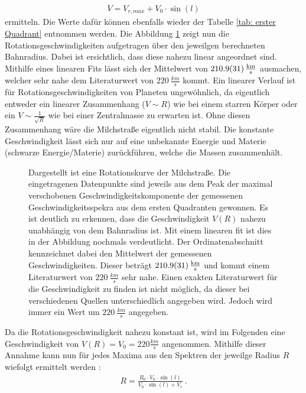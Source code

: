 \begin{align}
    V = V_{r,max} + V_0 \cdot \sin(l)
    \label{eq:V(R)}
\end{align}
ermitteln. Die Werte dafür können ebenfalls wieder der Tabelle \ref{tab: erster Quadrant} entnommen werden. Die Abbildung \ref{fig:VvonR} zeigt nun die Rotationsgeschwindigkeiten aufgetragen über den jeweilgen berechneten Bahnradius. Dabei ist ersichtlich, dass diese nahezu linear angeordnet sind. Mithilfe eines linearen Fits lässt sich der Mittelwert von $\SI{210.9 \pm 3.1}{\frac{km}{s}}$ ausmachen, welcher sehr nahe dem Literaturwert von $\SI{220}{\frac{km}{s}}$ \cite{LSR} kommt. Ein linearer Verlauf ist für Rotationsgeschwindigkeiten von Planeten ungewöhnlich, da eigentlich entweder ein linearer Zusammenhang ($V \sim R$) wie bei einem starren Körper oder ein $V \sim\frac{1}{\sqrt{R}}$ wie bei einer Zentralmasse zu erwarten ist. Ohne diesen Zusammenhang wäre die Milchstraße eigentlich nicht stabil. Die konstante Geschwindigkeit lässt sich nur auf eine unbekannte Energie und Materie (schwarze  Energie/Materie) zurückführen, welche die Massen zusammenhält.
\begin{figure}[H]
    \centering
    
    \caption[Rotationskurve der Milchstraße]{Dargestellt ist eine Rotationskurve der Milchstraße. Die eingetragenen Datenpunkte sind jeweils aus dem Peak der maximal verschobenen Geschwindigkeitskomponente der gemessenen Geschwindigkeitsspekra aus dem ersten Quadranten gewonnen. Es ist deutlich zu erkennen, dass die Geschwindigkeit $V(R)$ nahezu unabhängig von dem Bahnradius ist. Mit einem linearen fit ist dies in der Abbildung nochmals verdeutlicht. Der Ordinatenabschnitt kennzeichnet dabei den Mittelwert der gemessenen Geschwindigkeiten. Dieser beträgt $\SI{210.9 \pm 3.1}{\frac{km}{s}}$ und kommt einem Literaturwert von $\SI{220}{\frac{km}{s}}$ \cite{LSR} sehr nahe. Einen exakten Literaturwert für die Geschwindigkeit zu finden ist nicht möglich, da dieser bei verschiedenen Quellen unterschiedlich angegeben wird. Jedoch wird immer ein Wert um $\SI{220}{\frac{km}{s}}$ angegeben.}
    \label{fig:VvonR}
\end{figure}
Da die Rotationsgeschwindigkeit nahezu konstant ist, wird im Folgenden eine Geschwindigkeit von $V(R) = V_0 = \si{220}{\frac{km}{s}}$ angenommen. Mithilfe dieser Annahme kann nun für jedes Maxima aus den Spektren der jeweilge Radius $R$ wiefolgt ermittelt werden \cite{H1}:
\begin{align}
    R =\frac{R_0 \cdot V_0 \cdot \sin(l)}{V_0 \cdot \sin(l) + V_r} \ .
    \label{eq:BerechnungR}
\end{align}
